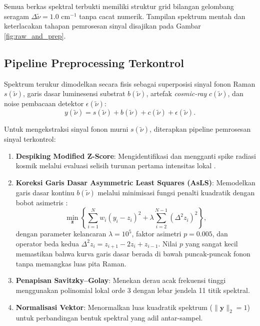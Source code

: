 Semua berkas spektral terbukti memiliki struktur grid bilangan gelombang seragam $\Delta\tilde{\nu} = 1.0\text{ cm}^{-1}$ tanpa cacat numerik. Tampilan spektrum mentah dan keterlacakan tahapan pemrosesan sinyal disajikan pada Gambar \ref{fig:raw_and_prep}.

\subsection{Pipeline Preprocessing Terkontrol}
Spektrum terukur dimodelkan secara fisis sebagai superposisi sinyal fonon Raman $s(\tilde{\nu})$, garis dasar luminesensi substrat $b(\tilde{\nu})$, artefak \textit{cosmic-ray} $c(\tilde{\nu})$, dan noise pembacaan detektor $\epsilon(\tilde{\nu})$:
\begin{equation}
y(\tilde{\nu}) = s(\tilde{\nu}) + b(\tilde{\nu}) + c(\tilde{\nu}) + \epsilon(\tilde{\nu}).
\label{eq:model_sinyal}
\end{equation}

Untuk mengekstraksi sinyal fonon murni $s(\tilde{\nu})$, diterapkan pipeline pemrosesan sinyal terkontrol:
\begin{enumerate}
    \item \textbf{Despiking Modified Z-Score}: Mengidentifikasi dan mengganti spike radiasi kosmik melalui evaluasi selisih turunan pertama intensitas lokal \cite{whitaker2018simple}.
    \item \textbf{Koreksi Garis Dasar Asymmetric Least Squares (AsLS)}: Memodelkan garis dasar kontinu $b(\tilde{\nu})$ melalui minimisasi fungsi penalti kuadratik dengan bobot asimetris \cite{eilers2005baseline}:
    \begin{equation}
    \min_{\mathbf{z}} \left\{ \sum_{i=1}^{N} w_i (y_i - z_i)^2 + \lambda \sum_{i=2}^{N-1} (\Delta^2 z_i)^2 \right\},
    \label{eq:asls}
    \end{equation}
    dengan parameter kelancaran $\lambda = 10^5$, faktor asimetri $p = 0.005$, dan operator beda kedua $\Delta^2 z_i = z_{i+1} - 2z_i + z_{i-1}$. Nilai $p$ yang sangat kecil memastikan bahwa kurva garis dasar berada di bawah puncak-puncak fonon tanpa memangkas luas pita Raman.
    \item \textbf{Penapisan Savitzky--Golay}: Menekan derau acak frekuensi tinggi menggunakan polinomial lokal orde 3 dengan lebar jendela 11 titik spektral.
    \item \textbf{Normalisasi Vektor}: Menormalkan luas kuadratik spektrum ($\|\mathbf{y}\|_2 = 1$) untuk perbandingan bentuk spektral yang adil antar-sampel.
\end{enumerate}

